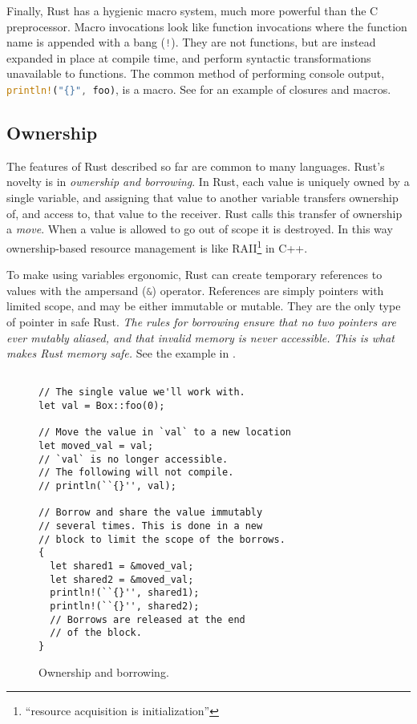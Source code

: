 Finally, Rust has a hygienic macro system, much more powerful than
the C preprocessor. Macro invocations look like function invocations
where the function name is appended with a bang (\lstinline[language=Rust]{!}).
They are not functions, but are instead expanded in place at compile time,
and perform syntactic transformations unavailable to functions.
The common method of performing console output, \lstinline[language=Rust]~println!("{}", foo)~,
is a macro.
See  for an example of closures and macros.

\subsection{Ownership}
The features of Rust described so far are common to many languages.
Rust's novelty is in \emph{ownership and borrowing}.
In Rust, each value is uniquely owned by a single variable, and
assigning that value to another variable transfers ownership of, and access to,
that value to the receiver. Rust calls this transfer of ownership a \emph{move}.
When a value is allowed to go out of scope
it is destroyed. In this way ownership-based resource management is
like RAII\footnote{``resource acquisition is initialization''} in C++.

To make using variables ergonomic, Rust can create temporary
references to values with the ampersand (\lstinline[language=Rust]{&})
operator. References are simply pointers with limited scope, and may be either
immutable or mutable. They are the only type of pointer in safe Rust.
\emph{The rules for borrowing ensure that no two pointers are ever mutably
aliased, and that invalid memory is never accessible.
This is what makes Rust memory safe.} See the example in .

\begin{figure}
\begin{lstlisting}

// The single value we'll work with.
let val = Box::foo(0);

// Move the value in `val` to a new location
let moved_val = val;
// `val` is no longer accessible.
// The following will not compile.
// println(``{}'', val);

// Borrow and share the value immutably
// several times. This is done in a new
// block to limit the scope of the borrows.
{
  let shared1 = &moved_val;
  let shared2 = &moved_val;
  println!(``{}'', shared1);
  println!(``{}'', shared2);
  // Borrows are released at the end
  // of the block.
}
\end{lstlisting}
  \caption{Ownership and borrowing.}
  \label{fig:own}
\end{figure}

